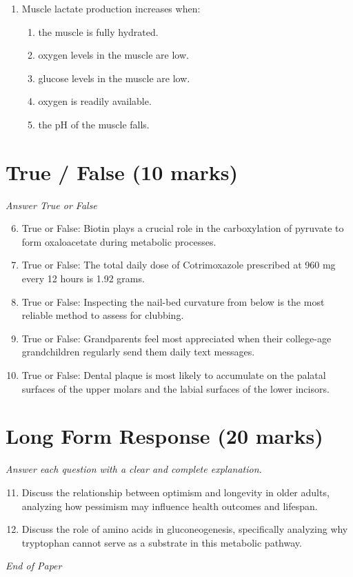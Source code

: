 \documentclass[12pt]{article}
\begin{document}
\begin{enumerate}[label=\arabic*.]
\begin{enumerate}[label=(\alph*)]
    \item Aunt
    \item Nephew
    \item Brother
    \item Grandchild
    \item Great-grandchild
\end{enumerate}
\item Muscle lactate production increases when:
\begin{enumerate}[label=(\alph*)]
    \item the muscle is fully hydrated.
    \item oxygen levels in the muscle are low.
    \item glucose levels in the muscle are low.
    \item oxygen is readily available.
    \item the pH of the muscle falls.
\end{enumerate}
\end{enumerate}

\section*{True / False (10 marks)}
\textit{Answer True or False}
\begin{enumerate}[label=\arabic*.]
\setcounter{enumi}{5}
\item True or False: Biotin plays a crucial role in the carboxylation of pyruvate to form oxaloacetate during metabolic processes.
\item True or False: The total daily dose of Cotrimoxazole prescribed at 960 mg every 12 hours is 1.92 grams.
\item True or False: Inspecting the nail-bed curvature from below is the most reliable method to assess for clubbing.
\item True or False: Grandparents feel most appreciated when their college-age grandchildren regularly send them daily text messages.
\item True or False: Dental plaque is most likely to accumulate on the palatal surfaces of the upper molars and the labial surfaces of the lower incisors.
\end{enumerate}

\section*{Long Form Response (20 marks)}
\textit{Answer each question with a clear and complete explanation.}
\begin{enumerate}[label=\arabic*.]
\setcounter{enumi}{10}
\item Discuss the relationship between optimism and longevity in older adults, analyzing how pessimism may influence health outcomes and lifespan.
\item Discuss the role of amino acids in gluconeogenesis, specifically analyzing why tryptophan cannot serve as a substrate in this metabolic pathway.
\end{enumerate}

\vfill
\noindent\textit{End of Paper}
\end{document}
